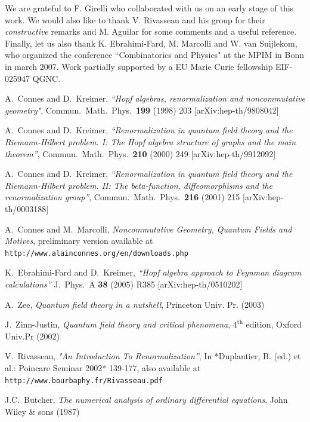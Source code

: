 \documentclass[12pt,here,feynmf]{article}
\begin{document}
We are grateful to F. Girelli who collaborated with us on an early stage of this work. We would also like to thank V. Rivasseau and his group for their \emph{constructive} remarks and M. Aguilar for some comments and a useful reference. Finally, let us also thank K. Ebrahimi-Fard, M. Marcolli and W. van Suijlekom, who organized the conference ``Combinatorics and Physics" at the MPIM in Bonn in march 2007. Work partially supported by a EU Marie Curie fellowship EIF-025947 QGNC.

\begin{thebibliography}{99}
  A.~Connes and D.~Kreimer,
  {\it ``Hopf algebras, renormalization and noncommutative geometry"},
  Commun.\ Math.\ Phys.\  {\bf 199} (1998) 203
  [arXiv:hep-th/9808042]


  A.~Connes and D.~Kreimer,
  {\it ``Renormalization in quantum field theory and the Riemann-Hilbert  problem.
  I: The Hopf algebra structure of graphs and the main theorem''},
  Commun.\ Math.\ Phys.\  {\bf 210} (2000) 249
  [arXiv:hep-th/9912092]

  A.~Connes and D.~Kreimer,
  {\it ``Renormalization in quantum field theory and the Riemann-Hilbert  problem.
  II: The beta-function, diffeomorphisms and the renormalization  group''},
  Commun.\ Math.\ Phys.\  {\bf 216} (2001) 215
  [arXiv:hep-th/0003188]

A.~Connes and M.~Marcolli, {\it Noncommutative Geometry, Quantum Fields and Motives}, preliminary version available at {\tt http://www.alainconnes.org/en/downloads.php}

  K.~Ebrahimi-Fard and D.~Kreimer,
  {\it ``Hopf algebra approach to Feynman diagram calculations''}
  J.\ Phys.\ A  {\bf 38} (2005) R385
  [arXiv:hep-th/0510202]

  A.~Zee,
  {\it Quantum field theory in a nutshell}, Princeton Univ. Pr. (2003)

J.~Zinn-Justin,
  {\it Quantum field theory and critical phenomena}, $4^{\mathrm{th}}$ edition,
  Oxford Univ.Pr (2002) 


  V.~Rivasseau,
  {\it "An Introduction To Renormalization''},
  In *Duplantier, B. (ed.) et al.: Poincare Seminar 2002* 139-177, also available at {\tt http://www.bourbaphy.fr/Rivasseau.pdf}

J.C.~Butcher, {\it The numerical analysis of ordinary differential equations}, John Wiley \& sons (1987) 



\end{thebibliography}
\end{document}
